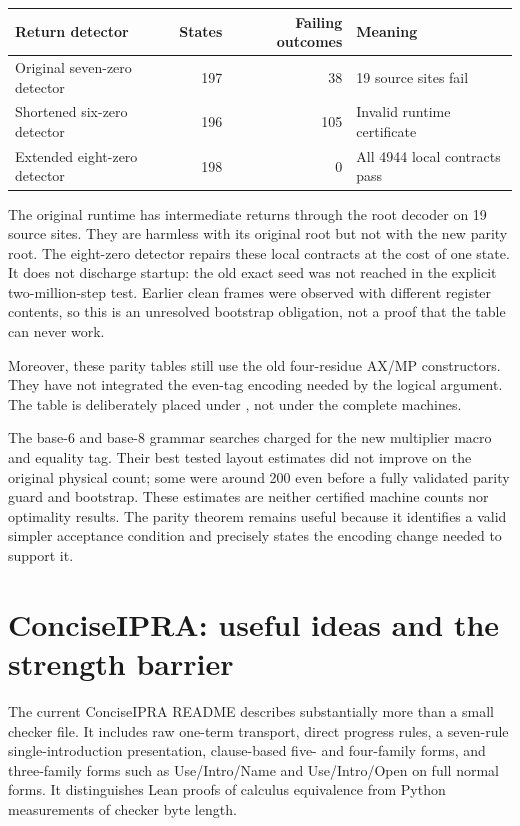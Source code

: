 \documentclass[11pt,a4paper]{article}
\begin{document}
\begin{center}
\begin{tabular}{@{}lrrl@{}}
\toprule
Return detector & States & Failing outcomes & Meaning\\
\midrule
Original seven-zero detector&197&38&19 source sites fail\\
Shortened six-zero detector&196&105&Invalid runtime certificate\\
Extended eight-zero detector&198&0&All 4944 local contracts pass\\
\bottomrule
\end{tabular}
\end{center}
The original runtime has intermediate returns through the root decoder on
19 source sites. They are harmless with its original root but not with the
new parity root. The eight-zero detector repairs these local contracts at
the cost of one state. It does not discharge startup: the old exact seed
was not reached in the explicit two-million-step test. Earlier clean frames
were observed with different register contents, so this is an unresolved
bootstrap obligation, not a proof that the table can never work.

Moreover, these parity tables still use the old four-residue AX/MP
constructors. They have not integrated the even-tag encoding needed by the
logical argument. The table is deliberately placed under
, not under the complete machines.

The base-6 and base-8 grammar searches charged for the new multiplier
macro and equality tag. Their best tested layout estimates did not improve
on the original physical count; some were around 200 even before a fully
validated parity guard and bootstrap. These estimates are neither certified
machine counts nor optimality results. The parity theorem remains useful
because it identifies a valid simpler acceptance condition and precisely
states the encoding change needed to support it.

\section{ConciseIPRA: useful ideas and the strength barrier}
The current ConciseIPRA README \cite{ipra} describes substantially more than
a small checker file. It includes raw one-term transport, direct progress
rules, a seven-rule single-introduction presentation, clause-based five-
and four-family forms, and three-family forms such as Use/Intro/Name and
Use/Intro/Open on full normal forms. It distinguishes Lean proofs of
calculus equivalence from Python measurements of checker byte length.
\end{document}
